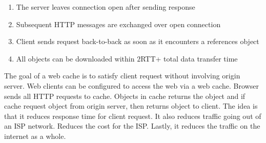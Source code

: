 \documentclass[a4paper]{article}
\theoremstyle{plain}
\theoremstyle{definition}
\newtheorem{defn}{Definition}[section]
\newtheorem{exmp}{Example}[section]
\theoremstyle{remark}
\begin{document}
\begin{tcolorbox}[colback=black!3!white,colframe=black!60!white,title=\begin{exmp}Persistent HTTP \label{Persistent HTTP}\end{exmp}]
        \begin{enumerate}
        	\item The server leaves connection open after sending response
		\item Subsequent HTTP messages are exchanged over open connection
		\item Client sends request back-to-back as soon as it encounters a references object
		\item All objects can be downloaded within $2 $RTT+ total data transfer time
        \end{enumerate}
\end{tcolorbox}
\begin{tcolorbox}[colback=black!3!white,colframe=black!60!white,title=\begin{defn}Web Cache \label{Web Cache}\end{defn}]
The goal of a web cache is to satisfy client request without involving origin server. Web clients can be configured to access the web via a web cache. Browser sends all HTTP requests to cache. Objects in cache returns the object and if cache request object from origin server, then returns object to client. The idea is that it reduces response time for client request. It also reduces traffic going out of an ISP network. Reduces the cost for the ISP. Lastly, it reduces the traffic on the internet as a whole.
\end{tcolorbox}
\end{document}
